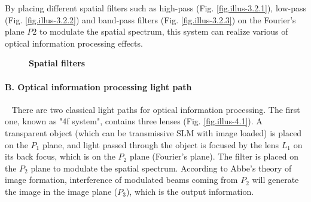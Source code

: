 \documentclass[10pt,a4paper,twocolumn,twoside,UTF8]{article}
\begin{document}
		By placing different spatial filters such as high-pass (Fig. \ref{fig.illus-3.2.1}), low-pass (Fig. \ref{fig.illus-3.2.2}) and band-pass filters (Fig. \ref{fig.illus-3.2.3}) 
		on the Fourier's plane $P2$ to modulate the spatial spectrum, this system can realize various of optical information processing effects.

		\begin{figure}[htbp]
			\centering		
			\caption{\textbf{Spatial filters}}
		\end{figure}



		\paragraph{B. Optical information processing light path}~
		\newline 
		\indent
		There are two classical light paths for optical information processing. 
		The first one, known as "4f system", contains three lenses (Fig. \ref{fig.illus-4.1}). 
		A transparent object (which can be transmissive SLM with image loaded) is placed on the $P_1$ plane, and light passed through the object is focused by the lens $L_1$ on its back focus, which is on the $P_2$ plane (Fourier's plane). 
		The filter is placed on the $P_2$ plane to modulate the spatial spectrum. 
		According to Abbe's theory of image formation, interference of modulated beams coming from $P_2$ will generate the image in the image plane ($P_3$), which is the output information.
\end{document}
